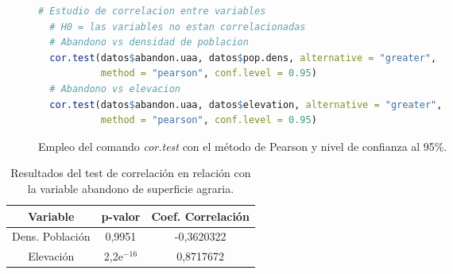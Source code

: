 \documentclass[11pt,a4paper]{article}
\begin{document}
\begin{figure}
\centering
\begin{lstlisting}[language = R]
  # Estudio de correlacion entre variables
  # H0 = las variables no estan correlacionadas
  # Abandono vs densidad de poblacion
  cor.test(datos$abandon.uaa, datos$pop.dens, alternative = "greater",
           method = "pearson", conf.level = 0.95)
  # Abandono vs elevacion
  cor.test(datos$abandon.uaa, datos$elevation, alternative = "greater",
           method = "pearson", conf.level = 0.95)
\end{lstlisting}
\caption{Empleo del comando \textit{cor.test} con el método de Pearson y nivel de confianza al 95\%.}
\label{fig:cor.test}
\end{figure}

\begin{table}[ht]
\centering
\begin{tabular}{ccc}
\toprule[0.4mm]
Variable & p-valor & Coef. Correlación\\
\midrule
Dens. Población & 0,9951 & -0,3620322\\
Elevación & 2,2e$^{-16}$ & 0,8717672\\
\bottomrule[0.4mm]
\end{tabular}
\caption{Resultados del test de correlación en relación con la variable abandono de superficie agraria.}
\label{tab:res.corr}
\end{table}

\begin{comment}
\begin{figure}
\centering
\begin{boxedverbatim}
    Pearson's product-moment correlation

data:  datos$abandon.uaa and datos$pop.dens
t = -2.6908, df = 48, p-value = 0.9951
alternative hypothesis: true correlation is greater than 0
95 percent confidence interval:
 -0.5505354  1.0000000
sample estimates:
       cor 
-0.3620322
\end{boxedverbatim}

\begin{boxedverbatim}
    Pearson's product-moment correlation

data:  datos$abandon.uaa and datos$elevation
t = 12.328, df = 48, p-value < 2.2e-16
alternative hypothesis: true correlation is greater than 0
95 percent confidence interval:
 0.8006674 1.0000000
sample estimates:
       cor 
0.8717672 
\end{boxedverbatim}
\captionsetup{font={footnotesize,it}}
\caption{Resultados del test de correlación.}
\label{fig:res.corr}
\end{figure}
\end{comment}
\end{document}
